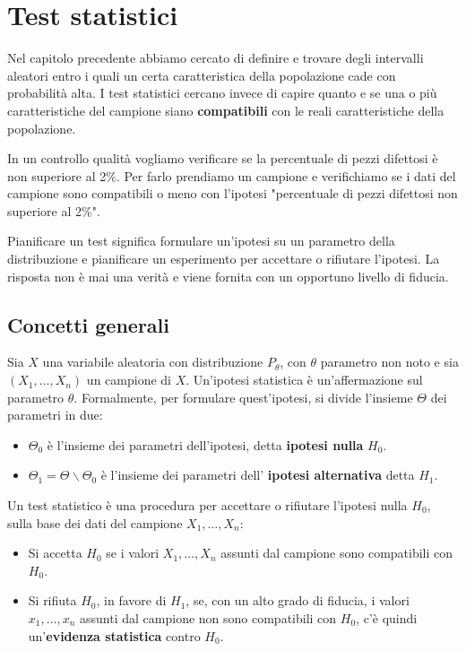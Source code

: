 \chapter{Test statistici}
Nel capitolo precedente abbiamo cercato di definire e trovare degli intervalli aleatori entro i
quali un certa caratteristica della popolazione cade con probabilità alta. I test statistici
cercano invece di capire quanto e se una o più caratteristiche del campione siano
\textbf{compatibili} con le reali caratteristiche della popolazione.

In un controllo qualità vogliamo verificare se la percentuale di pezzi difettosi è non superiore
al 2\%. Per farlo prendiamo un campione e verifichiamo se i dati del campione sono compatibili o
meno con l'ipotesi "percentuale di pezzi difettosi non superiore al 2\%".

Pianificare un test significa formulare un'ipotesi su un parametro della distribuzione e
pianificare un esperimento per accettare o rifiutare l'ipotesi. La risposta non è mai una verità
e viene fornita con un opportuno livello di fiducia.

\section{Concetti generali}
Sia $X$ una variabile aleatoria con distribuzione $P_\theta$, con $\theta$ parametro non noto e
sia $(X_1, \dots, X_n)$ un campione \iid di $X$. Un'ipotesi statistica è un'affermazione sul
parametro $\theta$. Formalmente, per formulare quest'ipotesi, si divide l'insieme $\Theta$ dei
parametri in due:
\begin{itemize}
	\item $\Theta_0$ è l'insieme dei parametri dell'ipotesi, detta \textbf{ipotesi nulla} $H_0$.
	\item $\Theta_1 = \Theta \backslash \Theta_0$ è l'insieme dei parametri dell'
	      \textbf{ipotesi alternativa} detta $H_1$.
\end{itemize}
Un test statistico è una procedura per accettare o rifiutare l'ipotesi nulla $H_0$, sulla base dei
dati del campione $X_1, \dots, X_n$:
\begin{itemize}
	\item Si accetta $H_0$ se i valori $X_1, \dots, X_n$ assunti dal campione sono compatibili con
	      $H_0$.
	\item Si rifiuta $H_0$, in favore di $H_1$, se, con un alto grado di fiducia, i valori
	      $x_1, \dots, x_n$ assunti dal campione non sono compatibili con $H_0$, c'è quindi
	      un'\textbf{evidenza statistica} contro $H_0$.
\end{itemize}

